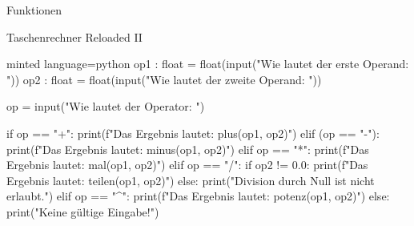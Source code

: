 \begin{task}[points=auto]{Funktionen}
\begin{subtask*}[points=0]{Taschenrechner Reloaded II }
\begin{solution}
\begin{codeBlock}[]{minted language=python}
                op1 : float = float(input("Wie lautet der erste Operand: "))
                op2 : float = float(input("Wie lautet der zweite Operand: "))

                op = input("Wie lautet der Operator: ")

                if op == "+":
                    print(f"Das Ergebnis lautet: {plus(op1, op2)}")
                elif (op == "-"):
                    print(f"Das Ergebnis lautet: {minus(op1, op2)}")
                elif op == "*":
                    print(f"Das Ergebnis lautet: {mal(op1, op2)}")
                elif op == "/":
                    if op2 != 0.0:
                        print(f"Das Ergebnis lautet: {teilen(op1, op2)}")
                    else:
                        print("Division durch Null ist nicht erlaubt.")
                elif op == "^":
                    print(f"Das Ergebnis lautet: {potenz(op1, op2)}")
                else:
                    print("Keine gültige Eingabe!")
            \end{codeBlock}
        \end{solution}
    \end{subtask*}
\end{task}
